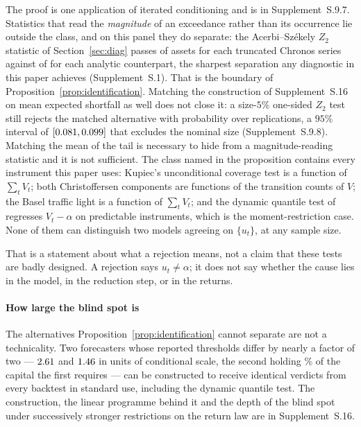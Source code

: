 \documentclass[preprint,11pt,authoryear]{elsarticle}
\newcommand{\1}{\boldsymbol{1}}
\begin{document}
The proof is one application of iterated conditioning and is in Supplement~S.9.7.
Statistics that read the \emph{magnitude} of an exceedance rather than its
occurrence lie outside the class, and on this panel they do separate: the
Acerbi--Sz\'ekely $Z_2$ statistic of Section~\ref{sec:diag} passes \nMainZTwoPassTrunc{} of
\nMainAssets{} assets for each truncated Chronos series against
\nMainZTwoPassAnalytic{} of
\nMainAssets{} for each analytic counterpart, the sharpest separation any
diagnostic in this paper achieves (Supplement~S.1). That is the boundary of
Proposition~\ref{prop:identification}. Matching the construction of
Supplement~S.16 on mean expected shortfall as well does not
close it: a size-$5\%$ one-sided $Z_2$ test still rejects the matched
alternative with probability \nSupPowerRej{} over \nSupPowerReps{} replications,
a $95\%$ interval of $[0.081, 0.099]$ that excludes the nominal
size (Supplement~S.9.8). Matching the mean of the tail is necessary to hide from
a magnitude-reading statistic and it is not sufficient.
The class named in the proposition contains every instrument this paper uses:
Kupiec's unconditional coverage test is a function of $\sum_t V_t$; both
Christoffersen components are functions of the transition counts of $V$; the
Basel traffic light is a function of $\sum_t V_t$; and the dynamic quantile test
of \citet{engle2004caviar} regresses $V_t-\alpha$ on predictable instruments,
which is the moment-restriction case. None of them can distinguish two models
agreeing on $\{u_t\}$, at any sample size.

That is a statement about what a rejection means, not a claim that these tests
are badly designed. A rejection says $u_t\neq\alpha$; it does not say whether the
cause lies in the model, in the reduction step, or in the returns.

\paragraph{How large the blind spot is} The alternatives
Proposition~\ref{prop:identification} cannot separate are not a technicality.
Two forecasters whose reported thresholds differ by nearly a factor of two ---
$2.61$ and $1.46$ in units of conditional scale, the second
holding \nPairCapitalPct\% of the capital the first requires --- can be
constructed to receive identical verdicts from every backtest in standard use,
including the dynamic quantile test. The construction, the linear programme
behind it and the depth of the blind spot under successively stronger
restrictions on the return law are in Supplement~S.16.
\end{document}
